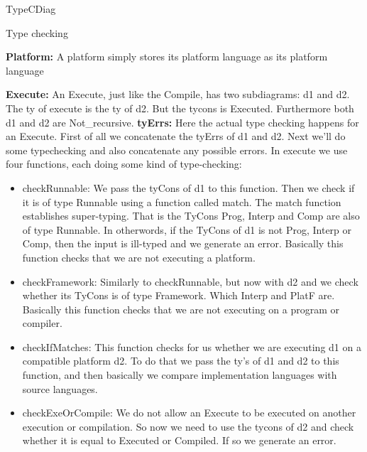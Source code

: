 \documentclass{article}
\begin{document}
\begin{subsection}{TypeCDiag}
\begin{subsubsection}{Type checking}
\hfill \break

\textbf{Platform:} A platform simply stores its platform language as its platform language

\hfill \break

\textbf{Execute:} An Execute, just like the Compile, has two subdiagrams: d1 and d2. The ty of execute is the ty of d2. But the tycons is Executed. Furthermore both d1 and d2 are Not\_recursive.
\textbf{tyErrs:} Here the actual type checking happens for an Execute. First of all we concatenate the tyErrs of d1 and d2. Next we'll do some typechecking and also concatenate any possible errors. In execute we use four functions, each doing some kind of type-checking:
	\begin{itemize}
	\item checkRunnable: We pass the tyCons of d1 to this function. Then we check if it is of type Runnable using a function called match. The match function establishes super-typing. That is the TyCons Prog, Interp and Comp are also of type Runnable. In otherwords, if the TyCons of d1 is not Prog, Interp or Comp, then the input is ill-typed and we generate an error. Basically this function checks that we are not executing a platform.
	\item checkFramework: Similarly to checkRunnable, but now with d2 and we check whether its TyCons is of type Framework. Which Interp and PlatF are. Basically this function checks that we are not executing on a program or compiler.
	\item checkIfMatches: This function checks for us whether we are executing d1 on a compatible platform d2. To do that we pass the ty's of d1 and d2 to this function, and then basically we compare implementation languages with source languages.
	\item checkExeOrCompile: We do not allow an Execute to be executed on another execution or compilation. So now we need to use the tycons of d2 and check whether it is equal to Executed or Compiled. If so we generate an error.
	\end{itemize}

\hfill \break


\end{subsubsection}
\end{subsection}
\end{document}
